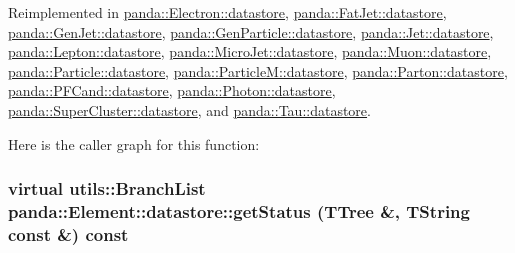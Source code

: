 Reimplemented in \hyperlink{structpanda_1_1Electron_1_1datastore_a82e74b804ecc9c1a138d5c3fcd6ef3a3}{panda::Electron::datastore}, \hyperlink{structpanda_1_1FatJet_1_1datastore_ae981e60d6fc142e3bbb4730a8a856fa7}{panda::FatJet::datastore}, \hyperlink{structpanda_1_1GenJet_1_1datastore_a2b1e39eb4f994f496aa013aaf82998c4}{panda::GenJet::datastore}, \hyperlink{structpanda_1_1GenParticle_1_1datastore_afe415117bf9f06e163aff5e341c9ef00}{panda::GenParticle::datastore}, \hyperlink{structpanda_1_1Jet_1_1datastore_a606415eee51c1a38fc0613f3b2946d1e}{panda::Jet::datastore}, \hyperlink{structpanda_1_1Lepton_1_1datastore_a527515ee96020a4aaef41d9de157c131}{panda::Lepton::datastore}, \hyperlink{structpanda_1_1MicroJet_1_1datastore_a03473e3dcba5abe73c123ce2c1d3292c}{panda::MicroJet::datastore}, \hyperlink{structpanda_1_1Muon_1_1datastore_aed9de75b6fb1e71671aa8a5b00862ace}{panda::Muon::datastore}, \hyperlink{structpanda_1_1Particle_1_1datastore_ad741e5ab6ebeb9ca897ba9472d0dea36}{panda::Particle::datastore}, \hyperlink{structpanda_1_1ParticleM_1_1datastore_a85c4ce11f1d7c6944a525ad2488880aa}{panda::ParticleM::datastore}, \hyperlink{structpanda_1_1Parton_1_1datastore_a37d5d064962d581ebccadf6a683b9dc6}{panda::Parton::datastore}, \hyperlink{structpanda_1_1PFCand_1_1datastore_ac7084e2d45811f6909e8c65c20941107}{panda::PFCand::datastore}, \hyperlink{structpanda_1_1Photon_1_1datastore_a255374780b23e06a1fd24235847c77de}{panda::Photon::datastore}, \hyperlink{structpanda_1_1SuperCluster_1_1datastore_ab60c317f5aa9292d2d8340e38f19a482}{panda::SuperCluster::datastore}, and \hyperlink{structpanda_1_1Tau_1_1datastore_af651d3ae362a4a6d99b1bff788accca3}{panda::Tau::datastore}.

Here is the caller graph for this function:\hypertarget{structpanda_1_1Element_1_1datastore_a9f9eb1f7611bc73f10a010a149d17a15}{
\subsubsection[{getStatus}]{\setlength{\rightskip}{0pt plus 5cm}virtual {\bf utils::BranchList} panda::Element::datastore::getStatus (TTree \&, \/  TString const \&) const}}
\label{structpanda_1_1Element_1_1datastore_a9f9eb1f7611bc73f10a010a149d17a15}


